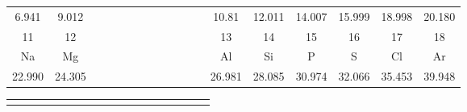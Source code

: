 \documentclass[10pt,landscape]{book}
\begin{document}
\begin{center}
\begin{tabular}{|c|c|p{17.8mm}*{9}{p{8.98mm}}|c|c|c|c|c|c|}
        \small 6.941                               & \small 9.012\hspace{0.5mm}                  &  &  &  &  &  &  &  &  &  &  & \small 10.81                               & \small 12.011                               & \small 14.007                             & \small 15.999 & \small 18.998                             & \small 20.180 \\[-1mm]\cline{1-2}\cline{13-18}
        \small 11                                  & \small 12                                   &  &  &  &  &  &  &  &  &  &  & \small 13                                  & \small 14                                   & \small 15                                 & \small 16     & \small 17                                 & \small 18     \\[-1mm]
        Na                                         & Mg                                          &  &  &  &  &  &  &  &  &  &  & Al                                         & Si                                          & P                                         & S             & Cl                                        & Ar            \\[-2mm]
        \small \hspace{0.75mm}22.990\hspace{0.8mm} & \small \hspace{0.83mm}24.305\hspace{0.83mm} &  &  &  &  &  &  &  &  &  &  & \small \hspace{0.8mm}26.981\hspace{0.78mm} & \small \hspace{0.95mm}28.085\hspace{0.73mm} & \small \hspace{0.8mm}30.974\hspace{0.8mm} & \small 32.066 & \small \hspace{0.8mm}35.453\hspace{0.8mm} & \small 39.948 \\
        \hline
    \end{tabular}
    \vspace{-3mm}
    \begin{tabular}{|c*{16}{|c}|c|}
                       &                &                &               &                &               &                &               &                &               &                &               &                &                &                &               &                &                                   \\[-6.8mm]

\end{tabular}
\end{center}
\end{document}
